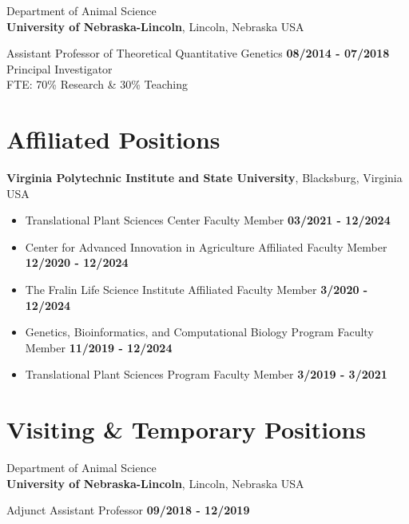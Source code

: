 \documentclass[margin,line,10pt]{res}
\begin{document}
\begin{resume}
Department of Animal Science\\
{\bf University of Nebraska-Lincoln}, Lincoln, Nebraska USA
\vspace{-.35cm}

Assistant Professor of Theoretical Quantitative Genetics   \hfill {\bf 08/2014 - 07/2018}\\
Principal Investigator \\
FTE: 70\% Research \& 30\% Teaching \\




\vspace{0.4cm}
\section{\sc Affiliated Positions}
{\bf Virginia Polytechnic Institute and State University}, Blacksburg, Virginia USA

\begin{itemize}
  \item Translational Plant Sciences Center Faculty Member  \hfill {\bf 03/2021 - 12/2024}\\
  \item Center for Advanced Innovation in Agriculture Affiliated Faculty Member  \hfill {\bf 12/2020 - 12/2024}\\
  \item The Fralin Life Science Institute Affiliated Faculty Member  \hfill {\bf 3/2020 - 12/2024}\\
\item Genetics, Bioinformatics, and Computational Biology Program Faculty Member  \hfill {\bf 11/2019 - 12/2024}\\
\item Translational Plant Sciences Program Faculty Member  \hfill {\bf 3/2019 - 3/2021}\\
\end{itemize}




\vspace{0.4cm}
\section{\sc Visiting \& Temporary Positions}
Department of Animal Science\\
{\bf University of Nebraska-Lincoln}, Lincoln, Nebraska USA
\vspace{-.35cm}

Adjunct Assistant Professor  \hfill {\bf 09/2018 - 12/2019}\\ 




\end{resume}
\end{document}

